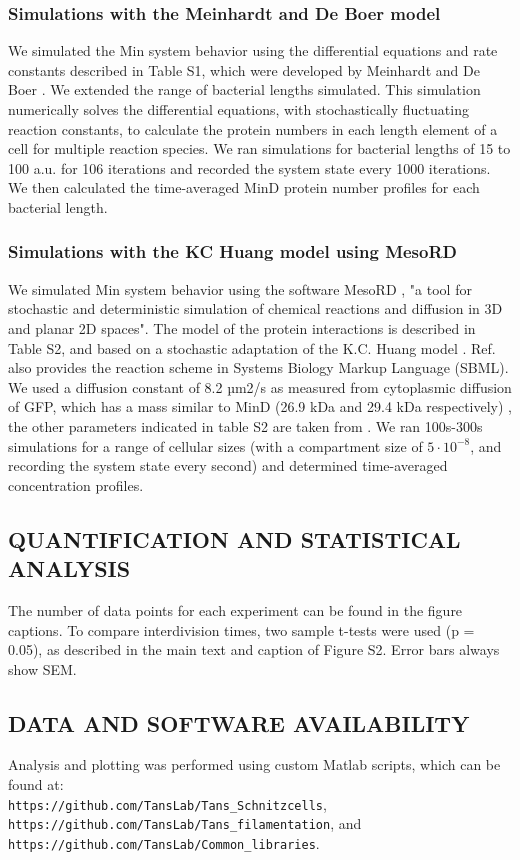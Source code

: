 \subsubsection{Simulations with the Meinhardt and De Boer model}
We simulated the Min system behavior using the differential equations and rate constants described in Table S1, which were developed by Meinhardt and De Boer \cite{Meinhardt2001}. We extended the range of bacterial lengths simulated. This simulation numerically solves the differential equations, with stochastically fluctuating reaction constants, to calculate the protein numbers in each length element of a cell for multiple reaction species. We ran simulations for bacterial lengths of 15 to 100 a.u. for 106 iterations and recorded the system state every 1000 iterations. We then calculated the time-averaged MinD protein number profiles for each bacterial length. 

\subsubsection{Simulations with the KC Huang model using MesoRD}
We simulated Min system behavior using the software MesoRD \cite{Hattne2005}, "a tool for stochastic and deterministic simulation of chemical reactions and diffusion in 3D and planar 2D spaces". 
The model of the protein interactions is described in Table S2, and based on a stochastic adaptation \cite{Fange2006} of the K.C. Huang model \cite{Huang2003}. Ref.  \cite{Fange2006} also provides the reaction scheme in Systems Biology Markup Language (SBML). 
We used a diffusion constant of 8.2 µm2/s as measured from cytoplasmic diffusion of GFP, which has a mass similar to MinD (26.9 kDa and 29.4 kDa respectively) \cite{Elowitz1999}, the other parameters indicated in table S2 are taken from \cite{Fange2006}. 
We ran 100s-300s simulations for a range of cellular sizes (with a compartment size of $5\cdot10^{-8}$, and recording the system state every second) and determined time-averaged concentration profiles.

\subsection{QUANTIFICATION AND STATISTICAL ANALYSIS}
The number of data points for each experiment can be found in the figure captions. To compare interdivision times, two sample t-tests were used (p = 0.05), as described in the main text and caption of Figure S2. Error bars always show SEM.

\subsection{DATA AND SOFTWARE AVAILABILITY}
Analysis and plotting was performed using custom Matlab scripts, which can be found at: \\
\texttt{https://github.com/TansLab/Tans\_Schnitzcells}, \\ 
\texttt{https://github.com/TansLab/Tans\_filamentation}, and \\
\texttt{https://github.com/TansLab/Common\_libraries}.
